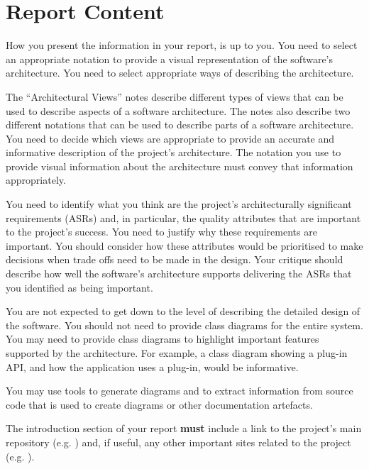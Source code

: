 \documentclass{csse4400}
\begin{document}
\section{Report Content}
How you present the information in your report, is up to you. You need to select an appropriate notation 
to provide a visual representation of the software's architecture. You need to select appropriate ways of describing
the architecture.

The ``Architectural Views'' notes describe different types of views that can be used to describe aspects of a software architecture.
The notes also describe two different notations that can be used to describe parts of a software architecture.
You need to decide which views are appropriate to provide an accurate and informative description of the project's architecture.
The notation you use to provide visual information about the architecture must convey that information appropriately.

You need to identify what you think are the project's architecturally significant requirements (ASRs)
and, in particular, the quality attributes that are important to the project's success.
You need to justify why these requirements are important.
You should consider how these attributes would be prioritised to make decisions when trade offs need to be made in the design.
Your critique should describe how well the software's architecture supports delivering the ASRs that you identified as being important.

You are not expected to get down to the level of describing the detailed design of the software.
You should not need to provide class diagrams for the entire system.
You may need to provide class diagrams to highlight important features supported by the architecture.
For example, a class diagram showing a plug-in API, and how the application uses a plug-in, would be informative.

You may use tools to generate diagrams and to extract information from source code that is used to create diagrams or other documentation artefacts.

The introduction section of your report \textbf{must} include a link to the project's main repository
(e.g. )
and, if useful, any other important sites related to the project
(e.g. ).

\end{document}
